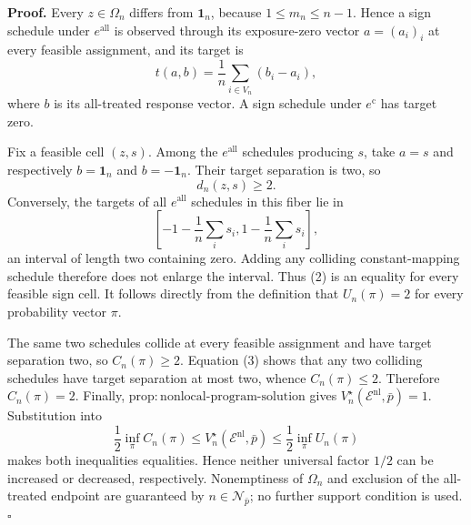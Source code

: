 \textbf{Proof.}
Every \(z\in\Omega_n\) differs from \(\mathbf 1_n\), because \(1\le m_n\le n-1\). Hence a sign schedule under \(e^{\mathrm{all}}\) is observed through its exposure-zero vector \(a=(a_i)_i\) at every feasible assignment, and its target is
\[
 t(a,b)=\frac1n\sum_{i\in V_n}(b_i-a_i), \tag{1}
\]
where \(b\) is its all-treated response vector. A sign schedule under \(e^{\mathrm c}\) has target zero.

Fix a feasible cell \((z,s)\). Among the \(e^{\mathrm{all}}\) schedules producing \(s\), take \(a=s\) and respectively \(b=\mathbf 1_n\) and \(b=-\mathbf 1_n\). Their target separation is two, so
\[
 d_n(z,s)\ge2. \tag{2}
\]
Conversely, the targets of all \(e^{\mathrm{all}}\) schedules in this fiber lie in
\[
 \left[-1-\frac1n\sum_i s_i, 1-\frac1n\sum_i s_i\right], \tag{3}
\]
an interval of length two containing zero. Adding any colliding constant-mapping schedule therefore does not enlarge the interval. Thus (2) is an equality for every feasible sign cell. It follows directly from the definition that \(U_n(\pi)=2\) for every probability vector \(\pi\).

The same two schedules collide at every feasible assignment and have target separation two, so \(C_n(\pi)\ge2\). Equation (3) shows that any two colliding schedules have target separation at most two, whence \(C_n(\pi)\le2\). Therefore \(C_n(\pi)=2\). Finally, \(\mathrm{prop{:}nonlocal\text{-}program\text{-}solution}\) gives \(V_n^\star(\mathcal E^{\mathrm{nl}},\bar p)=1\). Substitution into
\[
 \frac12\inf_\pi C_n(\pi)
 \le V_n^\star(\mathcal E^{\mathrm{nl}},\bar p)
 \le\frac12\inf_\pi U_n(\pi)
\]
makes both inequalities equalities. Hence neither universal factor \(1/2\) can be increased or decreased, respectively. Nonemptiness of \(\Omega_n\) and exclusion of the all-treated endpoint are guaranteed by \(n\in\mathcal N_{\bar p}\); no further support condition is used. \(\square\)